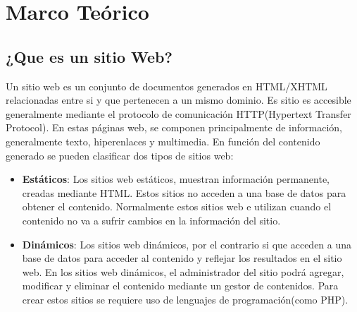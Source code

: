 \chapter{Marco Teórico}
\label{marcoteorico}




\section{¿Que es un sitio Web?}


Un sitio web es un conjunto de documentos generados en HTML/XHTML relacionadas entre si y que pertenecen a un mismo dominio. Es sitio es accesible generalmente mediante el protocolo de comunicación HTTP(Hypertext Transfer Protocol). En estas páginas web, se componen principalmente de información, generalmente texto, hiperenlaces y multimedia. En función del contenido generado se pueden clasificar dos tipos de sitios web:

\begin{itemize}
  \item \textbf{Estáticos}: Los sitios web estáticos, muestran información permanente, creadas mediante HTML. Estos sitios no acceden a una base de datos para obtener el contenido. Normalmente estos sitios web e utilizan cuando el contenido no va a sufrir cambios en la información del sitio.
  \item \textbf{Dinámicos}: Los sitios web dinámicos, por el contrario si que acceden a una base de datos para acceder al contenido y reflejar los resultados en el sitio web. En los sitios web dinámicos, el administrador del sitio podrá agregar, modificar y eliminar el contenido mediante un gestor de contenidos. Para crear estos sitios se requiere uso de lenguajes de programación(como PHP).
\end{itemize}


